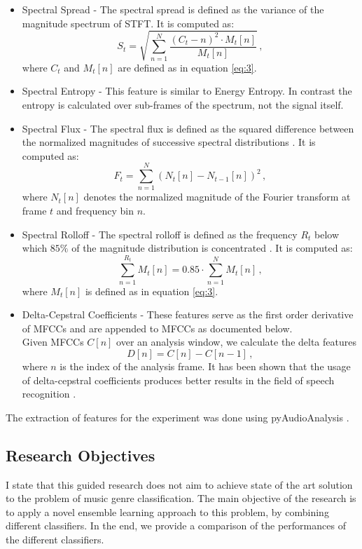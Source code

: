 \documentclass[a4paper,11pt,oneside]{article}
\begin{document}
\begin{itemize}
  \item Spectral Spread - The spectral spread is defined as the variance of the magnitude spectrum of STFT.
  It is computed as:
  \begin{equation}
    S_t = \sqrt{\sum_{n=1}^N \frac{(C_t-n)^2\cdot M_t[n]}{M_t[n]}}\,,
  \end{equation} where $C_t$ and $M_t[n]$ are defined as in equation \ref{eq:3}.
  \item Spectral Entropy - This feature is similar to Energy Entropy. In contrast the entropy is
  calculated over sub-frames of the spectrum, not the signal itself.
  \item Spectral Flux - The spectral flux is defined as the squared difference between the normalized magnitudes
  of successive spectral distributions \cite{tzan}. It is computed as:
  \begin{equation}
    F_t = \sum_{n=1}^N (N_t[n]-N_{t-1}[n])^2\,,
  \end{equation} where $N_t[n]$ denotes the normalized magnitude of the Fourier 
  transform at frame $t$ and frequency bin $n$.
  \item Spectral Rolloff - The spectral rolloff is defined as the frequency $R_t$ below which $85\%$ of the magnitude
  distribution is concentrated \cite{tzan}. It is computed as:
  \begin{equation}
    \sum_{n=1}^{R_t} M_t[n] = 0.85 \cdot \sum_{n=1}^N M_t[n]\,,
  \end{equation} where $M_t[n]$ is defined as in equation \ref{eq:3}.
  \item Delta-Cepstral Coefficients - These features serve as the first order derivative of MFCCs and
   are appended to MFCCs as documented below.\\
  Given MFCCs $C[n]$ over an analysis window, we calculate the delta features
  \begin{equation}
    D[n] = C[n]-C[n-1]\,,
  \end{equation} where $n$ is the index of the analysis frame. It has been shown that the usage of delta-cepstral
  coefficients produces better results in the field of speech recognition \cite{kumar2011delta}.
\end{itemize}
The extraction of features for the experiment was done using pyAudioAnalysis \cite{giannakopoulos2015pyaudioanalysis}.
\subsection{Research Objectives}
I state that this guided research does not aim to achieve state of the art solution to the problem of music genre 
classification. The main objective of the research is to apply a novel ensemble learning approach to this problem, by combining different classifiers. In the end, we provide a comparison of the performances of the different classifiers. 
\end{document}
